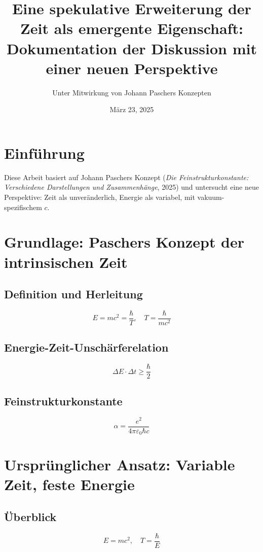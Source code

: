 \documentclass{article}
\title{Eine spekulative Erweiterung der Zeit als emergente Eigenschaft: \\Dokumentation der Diskussion mit einer neuen Perspektive}
\author{Unter Mitwirkung von Johann Paschers Konzepten}
\date{März 23, 2025}
\begin{document}
	
	\maketitle
	
	\section{Einführung}
	
	Diese Arbeit basiert auf Johann Paschers Konzept (\textit{Die Feinstrukturkonstante: Verschiedene Darstellungen und Zusammenhänge}, 2025) und untersucht eine neue Perspektive: Zeit als unveränderlich, Energie als variabel, mit vakuum-spezifischem \( c \).
	
	\section{Grundlage: Paschers Konzept der intrinsischen Zeit}
	
	\subsection{Definition und Herleitung}
	
	\[
	E = mc^2 = \frac{\hbar}{T}, \quad T = \frac{\hbar}{mc^2}
	\]
	
	\subsection{Energie-Zeit-Unschärferelation}
	
	\[
	\Delta E \cdot \Delta t \geq \frac{\hbar}{2}
	\]
	
	\subsection{Feinstrukturkonstante}
	
	\[
	\alpha = \frac{e^2}{4\pi \varepsilon_0 \hbar c}
	\]
	
	\section{Ursprünglicher Ansatz: Variable Zeit, feste Energie}
	
	\subsection{Überblick}
	
	\[
	E = mc^2, \quad T = \frac{\hbar}{E}
	\]
	
\end{document}

